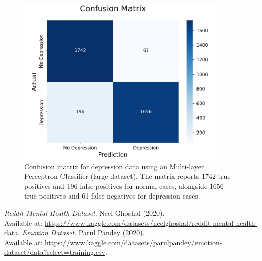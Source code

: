 \documentclass[runningheads,a4paper,11pt]{report}
\begin{document}
\begin{figure}[h]
\centering
\includegraphics[width=0.9\textwidth]{Depression-Data-MLPClassifier.jpg}
\caption[Confusion matrix for depression data ( Multi-layer Perceptron Classifier)]{\centering Confusion matrix for depression data using an  Multi-layer Perceptron Classifier (large dataset). The matrix reports 1742 true positives and 196 false positives for normal cases, alongside 1656 true positives and 61 false negatives for depression cases.}
\end{figure}

\newpage
\begin{thebibliography}{99}

\textit{Reddit Mental Health Dataset}.  
Neel Ghoshal (2020).  
\\Available at: \url{https://www.kaggle.com/datasets/neelghoshal/reddit-mental-health-data}. 
\textit{Emotion Dataset}.  
Parul Pandey (2020).  
\\Available at: \url{https://www.kaggle.com/datasets/parulpandey/emotion-dataset/data?select=training.csv}.  

\end{thebibliography}
\end{document}

